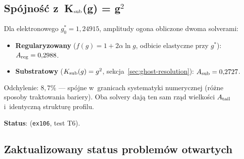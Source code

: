 \subsection{Sp\'ojno\'s\'c z~K$_{\rm sub}$(g) = g$^2$}\label{app:J2-Ksub}

\begin{proposition}%
\label{prop:J2-Ksub-compat}
Dla elektronowego $g_0^* = 1{,}24915$, amplitudy ogona
obliczone dwoma solverami:
\begin{itemize}[nosep]
  \item \textbf{Regularyzowany} ($f(g) = 1 + 2\alpha\ln g$,
    odbicie elastyczne przy $g^*$): $A_{\rm reg} = 0{,}2988$.
  \item \textbf{Substratowy} ($K_{\rm sub}(g) = g^2$,
    sekcja~\ref{sec:ghost-resolution}): $A_{\rm sub} = 0{,}2727$.
\end{itemize}
Odchylenie: $8{,}7\%$ --- sp\'ojne w~granicach systematyki
numerycznej (r\'o\.zne sposoby traktowania bariery).
Oba solvery daj\k{a} ten sam rz\k{a}d wielko\'sci $A_{\rm tail}$
i~identyczn\k{a} struktur\k{e} profilu.

\textbf{Status}:  (\texttt{ex106}, test T6).
\end{proposition}

\subsection{Zaktualizowany status problem\'ow otwartych}\label{app:J2-open}

